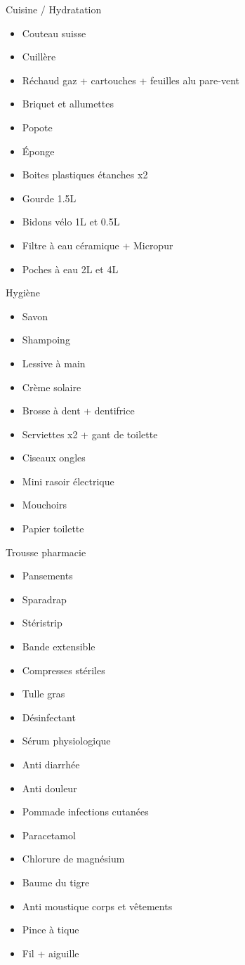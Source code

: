 Cuisine / Hydratation \newline
 \begin{itemize}
 \item Couteau suisse
 \item Cuillère
 \item Réchaud gaz + cartouches + feuilles alu pare-vent
 \item Briquet et allumettes
 \item Popote
 \item Éponge
 \item Boites plastiques étanches x2
 \item Gourde 1.5L
 \item Bidons vélo 1L et 0.5L
 \item Filtre à eau céramique + Micropur
 \item Poches à eau 2L et 4L
 \end{itemize}
 Hygiène \newline
 \begin{itemize}
 \item Savon
 \item Shampoing
 \item Lessive à main
 \item Crème solaire
 \item Brosse à dent + dentifrice
 \item Serviettes x2 + gant de toilette
 \item Ciseaux ongles
 \item Mini rasoir électrique
 \item Mouchoirs
 \item Papier toilette
 \end{itemize}
 Trousse pharmacie \newline
 \begin{itemize}
 \item Pansements
 \item Sparadrap
 \item Stéristrip
 \item Bande extensible
 \item Compresses stériles
 \item Tulle gras
 \item Désinfectant
 \item Sérum physiologique
 \item Anti diarrhée
 \item Anti douleur
 \item Pommade infections cutanées
 \item Paracetamol
 \item Chlorure de magnésium
 \item Baume du tigre
 \item Anti moustique corps et vêtements
 \item Pince à tique
 \item Fil + aiguille
 \end{itemize}
